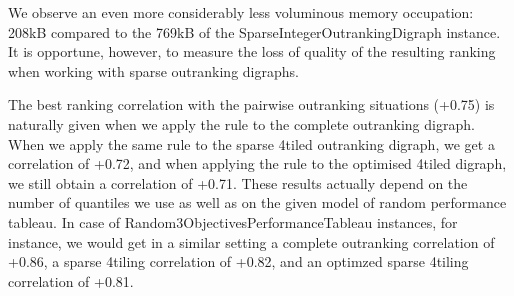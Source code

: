 \documentclass[a4paper,12pt,english]{sphinxhowto}
\begin{document}
We observe an even more considerably less voluminous memory occupation: 208kB compared to the 769kB of the SparseIntegerOutrankingDigraph instance. It is opportune, however, to measure the loss of quality of the resulting  ranking when working with sparse outranking digraphs.

\begin{sphinxVerbatim}[commandchars=\\\{\},numbers=left,firstnumber=1,stepnumber=1]
   
  
\PYGZbs{}
     \PYGZbs{}
       \PYG{p}{[}\PYG{p}{]}
\PYGZbs{}
     \PYGZbs{}
       \PYG{p}{[}\PYG{p}{]}
\PYGZbs{}
\end{sphinxVerbatim}

The best ranking correlation with the pairwise outranking situations (+0.75) is naturally given when we apply the  rule to the complete outranking digraph. When we apply the same rule to the sparse 4\sphinxhyphen{}tiled outranking digraph, we get a correlation of +0.72, and when applying the  rule to the optimised 4\sphinxhyphen{}tiled digraph, we still obtain a correlation of +0.71. These results actually depend on the number of quantiles we use as well as on the given model of random performance tableau. In case of Random3ObjectivesPerformanceTableau instances, for instance, we would get in a similar setting a complete outranking correlation of +0.86, a sparse 4\sphinxhyphen{}tiling correlation of +0.82, and an optimzed sparse 4\sphinxhyphen{}tiling correlation of +0.81.
\end{document}
